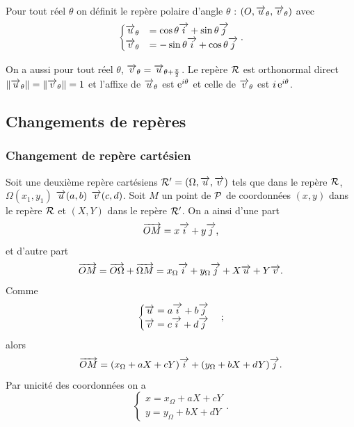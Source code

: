 \begin{defdef}
  Pour tout réel \(\theta\) on définit le repère polaire d'angle \(\theta\) : \((O, \vu_\theta, \vv_\theta)\) avec 
  \begin{equation}
    \begin{cases} 
      \vu_\theta&=\cos \theta \vi + \sin \theta \vj \\ 
      \vv_\theta&=-\sin \theta \vi + \cos \theta \vj
    \end{cases}.
  \end{equation}
\end{defdef}

On a aussi pour tout réel \(\theta\), \(\vv_\theta=\vu_{\theta+\frac{\pi}{2}}\). Le repère \(\Rep\) est orthonormal direct \(\norme{\vu_\theta}=\norme{\vv_\theta}=1\) et l'affixe de \(\vu_\theta\) est \(\e^{i \theta}\) et celle de \(\vv_\theta\) est \(i \e^{i \theta}\). %
%
\subsection{Changements de repères}
\label{subsec:changementsderepere}
\subsubsection{Changement de repère cartésien}
\label{subsubsec:changementsdereperecart}
Soit une deuxième repère cartésiens \(\Rep'=(\Omega,\vu,\vv)\) tels que dans le repère \(\Rep\), \(\Omega(x_1,y_1)\) \(\vu(a,b)\) \(\vv(c,d)\). Soit \(M\) un point de \(\P\) de coordonnées \((x,y)\) dans le repère \(\Rep\) et \((X,Y)\) dans le repère \(\Rep'\).
On a ainsi d'une part
\begin{equation}
 \vect{OM}=x \vi+ y \vj, 
\end{equation}
et d'autre part
\begin{equation}
  \vect{OM}=\vect{O\Omega}+\vect{\Omega M}=x_\Omega \vi + y_\Omega \vj + X \vu +Y\vv.
\end{equation}
Comme
\begin{equation}
  \begin{cases}
    \vu=a \vi + b \vj \\
    \vv=c\vi+d\vj
  \end{cases};
\end{equation}
alors
\begin{equation}
 \vect{OM}=(x_\Omega+aX+cY)\vi+(y_\Omega+bX+dY) \vj. 
\end{equation}
Par unicité des coordonnées on a
\begin{equation}
  \begin{cases}
    x=x_\Omega+aX+cY\\
    y=y_\Omega+bX+dY
  \end{cases}.
\end{equation}
%
